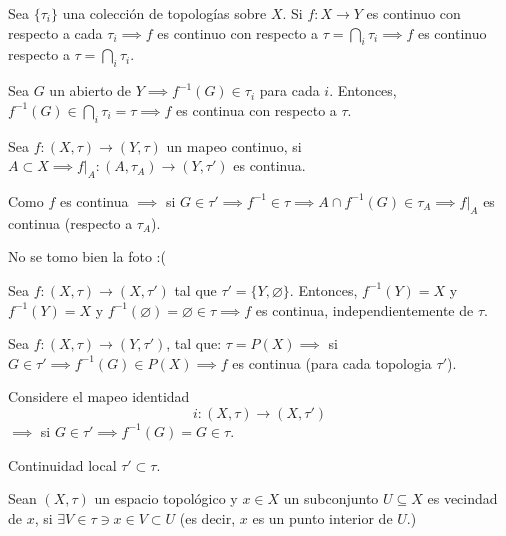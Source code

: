 \begin{prop}
    Sea $\{\tau_i\}$ una colección de topologías sobre $X$. Si $f:X\to Y$ es continuo con respecto a cada $\tau_i\implies f$ es continuo con respecto a $\tau=\bigcap_i\tau_i\implies f$ es continuo respecto a $\tau=\bigcap_i \tau_i$.
    \begin{dem}
        Sea $G$ un abierto de $Y\implies f^{-1}(G)\in \tau_i$ para cada $i$. Entonces, $f^{-1}(G)\in \bigcap_i\tau_i=\tau\implies f$ es continua con respecto a $\tau$. 
    \end{dem}
\end{prop}

\begin{prop}
    Sea $f:(X,\tau)\to (Y,\tau)$ un mapeo continuo, si $A\subset X\implies f|_A:(A,\tau_A)\to (Y,\tau')$ es continua. 
    \begin{dem}
        Como $f$ es continua $\implies$ si $G\in \tau'\implies f^{-1}\in \tau\implies A\cap f^{-1}(G)\in \tau_A\implies f|_A$ es continua (respecto a $\tau_A$). 
    \end{dem}
\end{prop} 
\begin{ejemplo}
    No se tomo bien la foto :(
\end{ejemplo}

\begin{ejemplo}
    Sea $f:(X,\tau)\to (X,\tau')$ tal que $\tau' =\{Y,\varnothing\}$. Entonces, $f^{-1}(Y)=X$ y $f^{-1}(Y)=X$ y $f^{-1}(\varnothing)=\varnothing\in \tau\implies f$ es continua, independientemente de $\tau$. 
\end{ejemplo}


\begin{ejemplo}
    Sea $f:(X,\tau)\to (Y,\tau')$, tal que: $\tau=P(X)\implies$ si $G\in \tau'\implies f^{-1}(G)\in P(X)\implies f$ es continua (para cada topologia $\tau'$). 
\end{ejemplo}

\begin{ejemplo}
    Considere el mapeo identidad 
    $$i:(X,\tau)\to (X,\tau')$$
    $\implies$ si $G\in\tau'\implies f^{-1}(G)=G\in \tau$. 
\end{ejemplo}

\begin{cajita}
    Continuidad local $\tau'\subset \tau$. 
\end{cajita}

\begin{definicion}
    Sean $(X,\tau)$ un espacio topológico y $x\in X$ un subconjunto $U\subseteq X$ es vecindad de $x$, si $\exists V\in \tau\ni x\in V\subset U$ (es decir, $x$ es un punto interior de $U$.)
\end{definicion}

